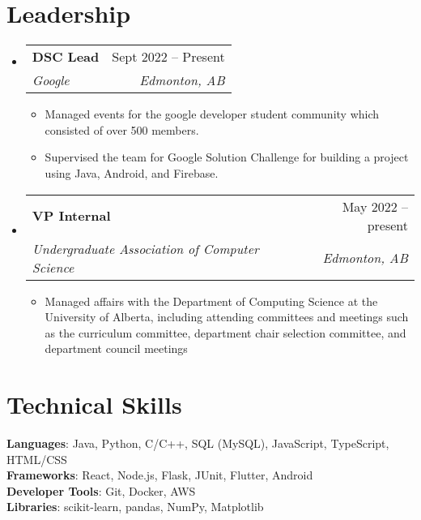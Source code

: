 \documentclass[letterpaper,11pt]{article}
\makeatletter
\newcommand{\resumeItem}[1]{
  \item\small{
    {#1 \vspace{-2pt}}
  }
}
\newcommand{\resumeSubheading}[4]{
  \vspace{-2pt}\item
    \begin{tabular*}{0.97\textwidth}[t]{l@{\extracolsep{\fill}}r}
      \textbf{#1} & #2 \\
      \textit{\small#3} & \textit{\small #4} \\
    \end{tabular*}\vspace{-7pt}
}
\newcommand{\resumeSubHeadingListStart}{\begin{itemize}[leftmargin=0.15in, label={}]}
\newcommand{\resumeSubHeadingListEnd}{\end{itemize}}
\newcommand{\resumeItemListStart}{\begin{itemize}}
\newcommand{\resumeItemListEnd}{\end{itemize}\vspace{-5pt}}
\makeatother
\begin{document}
\section{Leadership}
    \resumeSubHeadingListStart
      \resumeSubheading
        {DSC Lead}{Sept 2022 -- Present}
        {Google}{Edmonton, AB}
        \resumeItemListStart
          \resumeItem{Managed events for the google developer student community which consisted of over 500 members.}
          \resumeItem{Supervised the team for Google Solution Challenge for building a project using Java, Android, and Firebase.}
        \resumeItemListEnd
      \resumeSubheading
        {VP Internal}{May 2022 -- present}
        {Undergraduate Association of Computer Science}{Edmonton, AB}
        \resumeItemListStart
          \resumeItem{Managed affairs with the Department of Computing Science at the University of Alberta, including
                      attending committees and meetings such as the curriculum committee, department chair selection
                      committee, and department council meetings}
        \resumeItemListEnd
    \resumeSubHeadingListEnd
%
\section{Technical Skills}
 \begin{itemize}[leftmargin=0.15in, label={}]
    \small{\item{
     \textbf{Languages}{: Java, Python, C/C++, SQL (MySQL), JavaScript, TypeScript, HTML/CSS} \\
     \textbf{Frameworks}{: React, Node.js, Flask, JUnit, Flutter, Android} \\
     \textbf{Developer Tools}{: Git, Docker, AWS} \\
     \textbf{Libraries}{: scikit-learn, pandas, NumPy, Matplotlib}
    }}
 \end{itemize}

\end{document}
